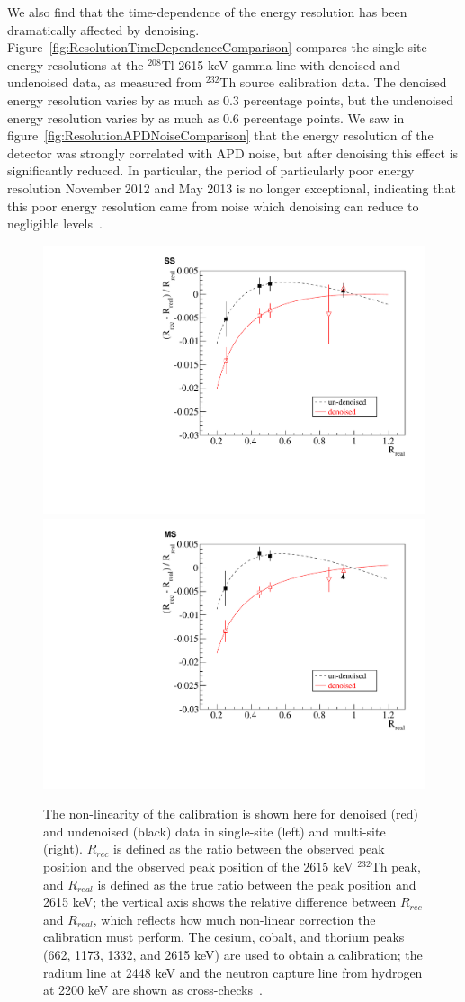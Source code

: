 We also find that the time-dependence of the energy resolution has been dramatically affected by denoising.  Figure~\ref{fig:ResolutionTimeDependenceComparison} compares the single-site energy resolutions at the $^{208}$Tl 2615 keV gamma line with denoised and undenoised data, as measured from $^{232}$Th source calibration data.  The denoised energy resolution varies by as much as 0.3 percentage points, but the undenoised energy resolution varies by as much as 0.6 percentage points.  We saw in figure~\ref{fig:ResolutionAPDNoiseComparison} that the energy resolution of the detector was strongly correlated with APD noise, but after denoising this effect is significantly reduced.  In particular, the period of particularly poor energy resolution November 2012 and May 2013 is no longer exceptional, indicating that this poor energy resolution came from noise which denoising can reduce to negligible levels~\cite{NewEXObb0nPaper_2014}.

\begin{figure}
\begin{center}
\includegraphics[keepaspectratio=true,width=.49\textwidth]{nonLinearity_ss.pdf}
\includegraphics[keepaspectratio=true,width=.49\textwidth]{nonLinearity_ms.pdf}
\end{center}
\renewcommand{\baselinestretch}{1}
\small\normalsize
\begin{quote}
\caption{The non-linearity of the calibration is shown here for denoised (red) and undenoised (black) data in single-site (left) and multi-site (right).  $R_{rec}$ is defined as the ratio between the observed peak position and the observed peak position of the $2615$ keV $^{232}$Th peak, and $R_{real}$ is defined as the true ratio between the peak position and 2615 keV; the vertical axis shows the relative difference between $R_{rec}$ and $R_{real}$, which reflects how much non-linear correction the calibration must perform.  The cesium, cobalt, and thorium peaks (662, 1173, 1332, and 2615 keV) are used to obtain a calibration; the radium line at 2448 keV and the neutron capture line from hydrogen at 2200 keV are shown as cross-checks~\cite{EnergyDocumentRun2ab}.}
\label{fig:NonLinearityOfCalibrationComparison}
\end{quote}
\end{figure}
\renewcommand{\baselinestretch}{2}
\small\normalsize

